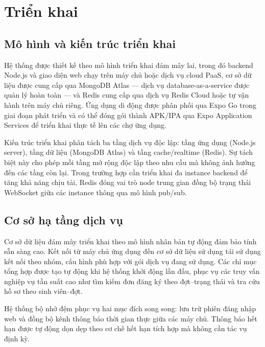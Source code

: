 \documentclass[../DoAn.tex]{subfiles}
\begin{document}
\section{Triển khai}
\label{sec:deployment}

\subsection*{Mô hình và kiến trúc triển khai}

Hệ thống được thiết kế theo mô hình triển khai đám mây lai, trong đó backend
Node.js và giao diện web chạy trên máy chủ hoặc dịch vụ cloud PaaS, cơ sở dữ
liệu được cung cấp qua MongoDB Atlas --- dịch vụ database-as-a-service được quản
lý hoàn toàn --- và Redis cung cấp qua dịch vụ Redis Cloud hoặc tự vận hành trên
máy chủ riêng. Ứng dụng di động được phân phối qua Expo Go trong giai đoạn phát
triển và có thể đóng gói thành APK/IPA qua Expo Application Services để triển
khai thực tế lên các chợ ứng dụng.

Kiến trúc triển khai phân tách ba tầng dịch vụ độc lập: tầng ứng dụng (Node.js
server), tầng dữ liệu (MongoDB Atlas) và tầng cache/realtime (Redis). Sự tách
biệt này cho phép mỗi tầng mở rộng độc lập theo nhu cầu mà không ảnh hưởng đến
các tầng còn lại. Trong trường hợp cần triển khai đa instance backend để tăng
khả năng chịu tải, Redis đóng vai trò node trung gian đồng bộ trạng thái WebSocket
giữa các instance thông qua mô hình pub/sub.

\subsection*{Cơ sở hạ tầng dịch vụ}

Cơ sở dữ liệu đám mây triển khai theo mô hình nhân bản tự động đảm bảo tính
sẵn sàng cao. Kết nối từ máy chủ ứng dụng đến cơ sở dữ liệu sử dụng tái sử
dụng kết nối theo nhóm, cấu hình phù hợp với gói dịch vụ đang sử dụng. Các
chỉ mục tổng hợp được tạo tự động khi hệ thống khởi động lần đầu, phục vụ các
truy vấn nghiệp vụ tần suất cao như tìm kiếm đơn đăng ký theo đợt--trạng thái
và tra cứu hồ sơ theo sinh viên--đợt.

Hệ thống bộ nhớ đệm phục vụ hai mục đích song song: lưu trữ phiên đăng nhập
web và đồng bộ kênh thông báo thời gian thực giữa các máy chủ. Thông báo hết
hạn được tự động dọn dẹp theo cơ chế hết hạn tích hợp mà không cần tác vụ định
kỳ.
\end{document}
